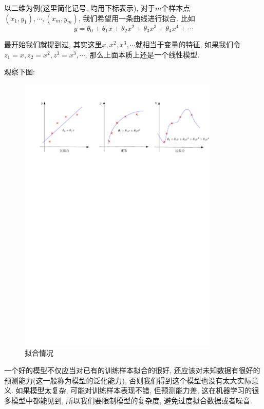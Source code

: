 \documentclass[a4paper,UTF8]{ctexart}
\theoremstyle{plain} \newtheorem{theorem}{定理}[section]
\theoremstyle{plain} \newtheorem{definition}{定义}[section]
\theoremstyle{plain} \newtheorem{lemma}{引理}[section]
\theoremstyle{plain} \newtheorem{proposition}{命题}[section]
\theoremstyle{plain} \newtheorem{example}{例}[section]
\theoremstyle{plain} \newtheorem{remark}{注}[section]
\theoremstyle{plain} \newtheorem{corollary}{推论}[section]
\begin{document}
以二维为例(这里简化记号, 均用下标表示), 对于$m$个样本点$(x_1, y_1), \cdots, (x_m, y_m)$, 我们希望用一条曲线进行拟合. 比如
\begin{equation*}
y = \theta_0 + \theta_1 x + \theta_2 x^{2} + \theta_3 x^{3} + \theta_{4} x^{4} + \cdots
\end{equation*}

最开始我们就提到过, 其实这里$x, x^2, x^3, \cdots$就相当于变量的特征, 如果我们令$z_{1} = x, z_{2} = x^2, z^{3} = x^3, \cdots$, 那么上面本质上还是一个线性模型.

观察下图:
\begin{figure}[!htb]
	\centering
	\includegraphics[width=0.85\textwidth]{fit.pdf}
	\caption{拟合情况}
	\label{overfit}
\end{figure}


一个好的模型不仅应当对已有的训练样本拟合的很好, 还应该对未知数据有很好的预测能力(这一般称为模型的泛化能力), 否则我们得到这个模型也没有太大实际意义. 如果模型太复杂, 可能对训练样本表现不错, 但预测能力差, 这在机器学习的很多模型中都能见到, 所以我们要限制模型的复杂度, 避免过度拟合数据或者噪音.
\end{document}
